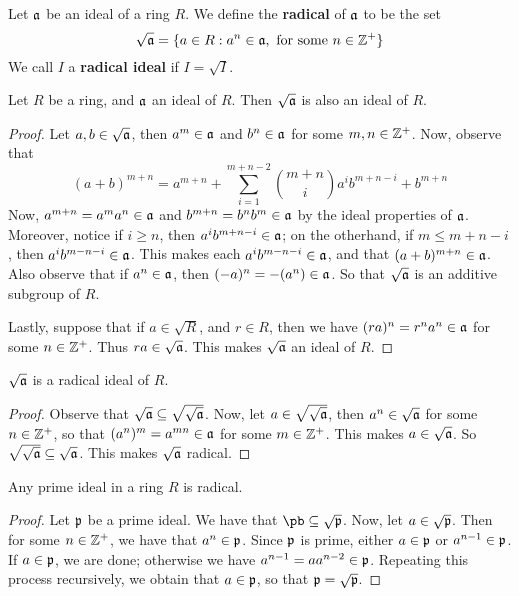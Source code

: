 \begin{definition}
    Let $\mathfrak{a}$ be an ideal of a ring  $R$. We define the  \textbf{radical} of
    $\mathfrak{a}$
    to be the set
    \begin{equation*}
        \sqrt{\mathfrak{a}}=\{a \in R : a^n \in \mathfrak{a}, \text{ for some } n \in \mathbb{Z}^+\}
    \end{equation*}
    We call $I$ a \textbf{radical ideal} if $I=\sqrt{I}$.
\end{definition}

\begin{lemma}\label{1.3.3}
    Let $R$ be a ring, and $\mathfrak{a}$ an ideal of $R$. Then $\sqrt{\mathfrak{a}}$ is also an
    ideal of $R$.
\end{lemma}
\begin{proof}
    Let $a,b \in \sqrt{\mathfrak{a}}$, then $a^m \in \mathfrak{a}$ and $b^n \in \mathfrak{a}$ for some $m,n
    \in \mathbb{Z}^+$. Now, observe that
    \begin{equation*}
        (a+b)^{m+n}=a^{m+n}+\sum_{i=1}^{m+n-2}{{m+n \choose
        i}a^{i}b^{m+n-i}}+b^{m+n}
    \end{equation*}
    Now, $a^{m+n}=a^ma^n \in \mathfrak{a}$ and $b^{m+n}=b^nb^m \in \mathfrak{a}$ by the ideal
    properties of $\mathfrak{a}$. Moreover, notice if $i \geq n$, then $a^ib^{m+n-i} \in
    \mathfrak{a}$; on the otherhand, if $m \leq m+n-i$, then $a^ib^{m-n-i} \in \mathfrak{a}$. This
    makes each $a^ib^{m-n-i} \in \mathfrak{a}$, and that $(a+b)^{m+n} \in \mathfrak{a}$. Also
    observe that if $a^n \in \mathfrak{a}$, then $(-a)^n=-(a^n) \in \mathfrak{a}$. So that
    $\sqrt{\mathfrak{a}}$ is an additive subgroup of $R$.

    Lastly, suppose that if $a \in \sqrt{R}$, and $r \in R$, then we have
    $(ra)^n=r^na^n \in \mathfrak{a}$ for some $n \in \mathbb{Z}^+$. Thus $ra \in \sqrt{\mathfrak{a}}$. This
    makes $\sqrt{\mathfrak{a}}$ an ideal of $R$.
\end{proof}
\begin{corollary}
    $\sqrt{\mathfrak{a}}$ is a radical ideal of $R$.
\end{corollary}
\begin{proof}
    Observe that $\sqrt{\mathfrak{a}} \subseteq \sqrt{\sqrt{\mathfrak{a}}}$. Now, let $a \in
    \sqrt{\sqrt{\mathfrak{a}}}$, then $a^n \in \sqrt{\mathfrak{a}}$ for some $n \in \mathbb{Z}^+$, so that
    $(a^n)^m=a^{mn} \in \mathfrak{a}$ for some $m \in \mathbb{Z}^+$. This makes $a \in
    \sqrt{\mathfrak{a}}$. So $\sqrt{\sqrt{\mathfrak{a}}} \subseteq \sqrt{\mathfrak{a}}$. This makes
    $\sqrt{\mathfrak{a}}$ radical.
\end{proof}

\begin{lemma}\label{1.3.4}
    Any prime ideal in a ring $R$ is radical.
\end{lemma}
\begin{proof}
    Let $\mathfrak{p}$ be a prime ideal. We have that $\pb \subseteq \sqrt{\pf}$. Now, let
    $a \in \sqrt{\mathfrak{p}}$. Then for some $n \in \mathbb{Z}^+$, we have that $a^n \in \mathfrak{p}$.
    Since $\mathfrak{p}$ is prime, either $a \in \mathfrak{p}$ or $a^{n-1} \in \mathfrak{p}$. If $a \in
    \mathfrak{p}$, we are done; otherwise we have $a^{n-1}=aa^{n-2} \in \mathfrak{p}$. Repeating
    this process recursively, we obtain that $a \in \mathfrak{p}$, so that
    $\mathfrak{p}=\sqrt{\mathfrak{p}}$.
\end{proof}

